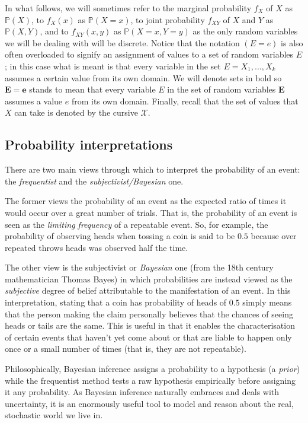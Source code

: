 In what follows, we will sometimes refer to the marginal probability $f_X$ of $X$ as $\mathbb{P}(X)$, to $f_X(x)$ as $\mathbb{P}(X = x)$, to joint probability $f_{XY}$ of $X$ and $Y$ as $\mathbb{P}(X,Y)$, and to $f_{XY}(x,y)$ as $\mathbb{P}(X=x,Y=y)$ as the only random variables we will be dealing with will be discrete.
Notice that the notation $(E = e)$ is also often overloaded to signify an assignment of values to a set of random variables $E$; in this case what is meant is that every variable in the set $E = {X_1,...,X_k}$ assumes a certain value from its own domain. 
We will denote sets in bold so $\boldsymbol{E} = \boldsymbol{e}$ stands to mean that every variable $E$ in the set of random variables $\boldsymbol{E}$ assumes a value $e$ from its own domain. 
Finally, recall that the set of values that $X$ can take is denoted by the cursive $\mathcal{X}$.

\subsection{Probability interpretations} \label{subsec:probability-interpretations}
There are two main views through which to interpret the probability of an event: the \textit{frequentist} and the \textit{subjectivist/Bayesian} one.

The former views the probability of an event as the expected ratio of times it would occur over a great number of trials.
That is, the probability of an event is seen as the \textit{limiting frequency} of a repeatable event.
So, for example, the probability of observing heads when tossing a coin is said to be $0.5$ because over repeated throws heads was observed half the time.

The other view is the subjectivist or \textit{Bayesian} one (from the 18th century mathematician Thomas Bayes) in which probabilities are instead viewed as the \textit{subjective} degree of belief attributable to the manifestation of an event.
In this interpretation, stating that a coin has probability of heads of $0.5$ simply means that the person making the claim personally believes that the chances of seeing heads or tails are the same.
This is useful in that it enables the characterisation of certain events that haven't yet come about or that are liable to happen only once or a small number of times (that is, they are not repeatable).

Philosophically, Bayesian inference assigns a probability to a hypothesis (a \textit{prior}) while the frequentist method tests a raw hypothesis empirically before assigning it any probability.
As Bayesian inference naturally embraces and deals with uncertainty, it is an enormously useful tool to model and reason about the real, stochastic world we live in.

